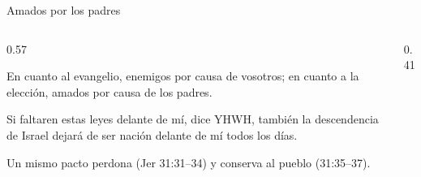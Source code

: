 \begin{frame}{Amados por los padres}
\begin{columns}[c,onlytextwidth]
\begin{column}{0.57\textwidth}
\begin{cita}[fontupper=\scriptsize\itshape]En cuanto al evangelio, enemigos por causa de vosotros; en cuanto a la elección, amados por causa de los padres.\end{cita}
\par\smallskip
\begin{cita}[fontupper=\scriptsize\itshape]Si faltaren estas leyes delante de mí, dice YHWH, también la descendencia de Israel dejará de ser nación delante de mí todos los días.\end{cita}
\scriptsize Un mismo pacto perdona (Jer 31:31--34) y conserva al pueblo (31:35--37).
\end{column}
\begin{column}{0.41\textwidth}\end{column}
\end{columns}
\end{frame}

